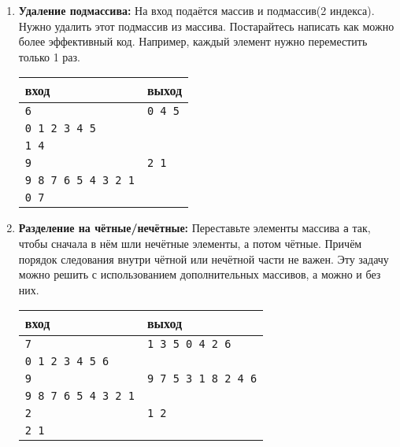 \documentclass{article}
\begin{document}
\begin{enumerate}
\item \textbf{Удаление подмассива:} На вход подаётся массив и подмассив(2 индекса). Нужно удалить этот подмассив из массива. Постарайтесь написать как можно более эффективный код. Например, каждый элемент нужно переместить только 1 раз.
\begin{center}
\begin{tabular}{ l | l }
 вход & выход \\ \hline
 \texttt{6} & \texttt{0 4 5}  \\  
 \texttt{0 1 2 3 4 5} &  \\ 
 \texttt{1 4} &   \\ \hline
 \texttt{9} & \texttt{2 1}  \\  
 \texttt{9 8 7 6 5 4 3 2 1} &  \\ 
 \texttt{0 7} &   \\
\end{tabular}
\end{center}
\item \textbf{Разделение на чётные/нечётные:} Переставьте элементы массива \texttt{a} так, чтобы сначала в нём шли нечётные элементы, а потом чётные. Причём порядок следования внутри чётной или нечётной части не важен. Эту задачу можно решить с использованием дополнительных массивов, а можно и без них.
\begin{center}
\begin{tabular}{ l | l }
 вход & выход \\ \hline
 \texttt{7} & \texttt{1 3 5 0 4 2 6}  \\  
 \texttt{0 1 2 3 4 5 6} & \\ \hline
 \texttt{9} & \texttt{9 7 5 3 1 8 2 4 6}  \\  
 \texttt{9 8 7 6 5 4 3 2 1} &  \\ \hline
 \texttt{2} & \texttt{1 2}  \\  
 \texttt{2 1} &  \\
\end{tabular}
\end{center}


\end{enumerate}
\end{document}
